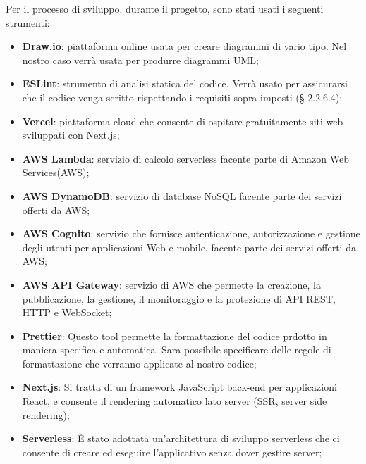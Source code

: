 Per il processo di sviluppo, durante il progetto, sono stati usati i seguenti strumenti:
\begin{itemize}
\item \textbf{Draw.io}: piattaforma online usata per creare diagrammi di vario tipo. Nel nostro caso verrà usata per produrre diagrammi UML;
\item \textbf{ESLint}: strumento di analisi statica del codice. Verrà usato per assicurarsi che il codice venga scritto rispettando i requisiti sopra imposti (§ 2.2.6.4);
\item \textbf{Vercel}: piattaforma cloud che consente di ospitare gratuitamente siti web sviluppati con Next.js;
\item \textbf{AWS Lambda}: servizio di calcolo serverless facente parte di Amazon Web Services(AWS);
\item \textbf{AWS DynamoDB}: servizio di database NoSQL facente parte dei servizi offerti da AWS;
\item \textbf{AWS Cognito}: servizio che fornisce autenticazione, autorizzazione e gestione degli utenti per applicazioni Web e mobile, facente parte dei servizi offerti da AWS;
\item \textbf{AWS API Gateway}: servizio di AWS che permette la creazione, la pubblicazione, la gestione, il monitoraggio e la protezione di API REST, HTTP e WebSocket;
\item \textbf{Prettier}: Questo tool permette la formattazione del codice prdotto in maniera specifica e automatica. Sara possibile specificare delle regole di formattazione che verranno applicate al nostro codice;
\item \textbf{Next.js}: Si tratta di un framework JavaScript back-end per applicazioni React, e consente il rendering automatico lato server (SSR, server side rendering);
\item \textbf{Serverless}: È stato adottata un'architettura di sviluppo serverless che ci consente di creare ed eseguire l'applicativo senza dover gestire server;
\end{itemize} 